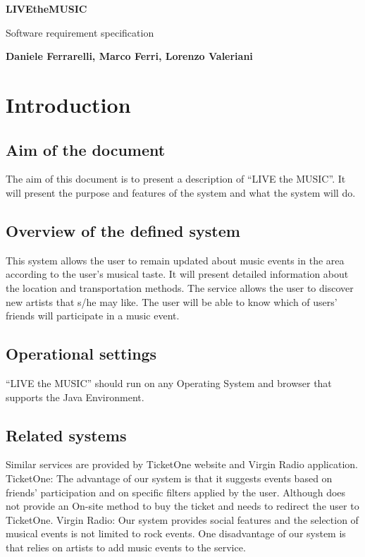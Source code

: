 \documentclass[11pt,a4paper]{article}
\begin{document}
\begin{titlepage}
   \begin{center}
       \vspace*{1cm}
 
       \textbf{LIVEtheMUSIC}
 
       \vspace{0.5cm}
        Software requirement specification
 
       \vspace{5cm}
 
       \textbf{Daniele Ferrarelli, Marco Ferri, Lorenzo Valeriani}
 
       \vfill
   \end{center}
\end{titlepage}
\section{Introduction}
\subsection{Aim of the document}
The aim of this document is to present a description of “LIVE the MUSIC”. It will present the purpose and features of the system and what the system will do.
\subsection{Overview of the defined system}
This system allows the user to remain updated about music events in the area according to the user’s musical taste. It will present detailed information about the location and transportation methods. The service allows the user to discover new artists that s/he may like. The user will be able to know which of users’ friends will participate in a music event.
\subsection{Operational settings}
“LIVE the MUSIC” should run on any Operating System and browser that supports the Java Environment. 
\subsection{Related systems}
Similar services are provided by TicketOne website and Virgin Radio application.
TicketOne: 
The advantage of our system is that it suggests events based on friends’ participation and on specific filters applied by the user. Although does not provide an On-site method to buy the ticket and needs to redirect the user to TicketOne. 
Virgin Radio:
Our system provides social features and the selection of musical events is not limited to rock events. One disadvantage of our system is that relies on artists to add music events to the service.
\end{document}
